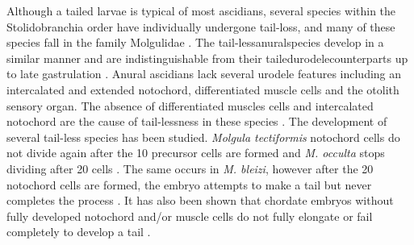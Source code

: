 Although a tailed larvae is typical of most ascidians, several species within the Stolidobranchia order have individually undergone tail-loss, and many of these species fall in the family Molgulidae \cite{berrill_studies_1931, jeffery_evolution_1999, huber_evolution_2000, maliska_molgula_2010}. The tail-less\textemdash anural\textemdash species develop in a similar manner and are indistinguishable from their tailed\textemdash urodele\textemdash counterparts up to late gastrulation \cite{berrill_studies_1931, swalla_interspecific_1990, jeffery_factors_1992}. Anural ascidians lack several urodele features including an intercalated and extended notochord, differentiated muscle cells and the otolith sensory organ. The absence of differentiated muscles cells and intercalated notochord are the cause of tail-lessness in these species \cite{miyamoto_formation_1985, swalla_interspecific_1990}. The development of several tail-less species has been studied. \textit{Molgula tectiformis} notochord cells do not divide again after the 10 precursor cells are formed and \textit{M. occulta} stops dividing after 20 cells \cite{jeffery_evolution_1999}. The same occurs in \textit{M. bleizi}, however after the 20 notochord cells are formed, the embryo attempts to make a tail but never completes the process \cite{swalla_novel_1993}. It has also been shown that chordate embryos without fully developed notochord and/or muscle cells do not fully elongate or fail completely to develop a tail \cite{jeffery_evolution_1999,takada_brachyury_2002,stemple_structure_2005}. 
